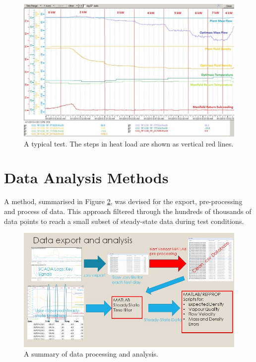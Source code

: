 \documentclass{report}
\begin{document}
\begin{figure}
\includegraphics[width=\textwidth]{typicalTestEdited}
\caption{A typical test. The steps in heat load are shown as vertical red lines.}
\label{fig:typicalTest}
\end{figure}

\section{Data Analysis Methods}
A method, summarised in Figure \ref{fig:processing}, was devised for the export, pre-processing and process of data. This approach filtered through the hundreds of thousands of data points to reach a small subset of steady-state data during test conditions. 

\begin{figure}
\includegraphics[width=\textwidth]{processing}
\caption{A summary of data processing and analysis.}
\label{fig:processing}
\end{figure}
\end{document}
